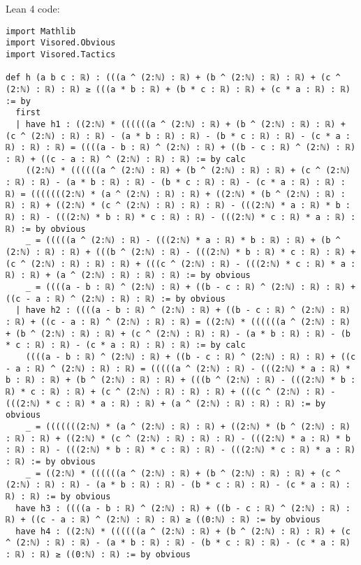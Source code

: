 \documentclass{article}
\begin{document}
Lean 4 code:
\begin{tcolorbox}[colback=white!10, width=\linewidth]
\begin{lstlisting}[language=Lean4]
import Mathlib
import Visored.Obvious
import Visored.Tactics

def h (a b c : ℝ) : (((a ^ (2:ℕ) : ℝ) + (b ^ (2:ℕ) : ℝ) : ℝ) + (c ^ (2:ℕ) : ℝ) : ℝ) ≥ (((a * b : ℝ) + (b * c : ℝ) : ℝ) + (c * a : ℝ) : ℝ) := by
  first
  | have h1 : ((2:ℕ) * ((((((a ^ (2:ℕ) : ℝ) + (b ^ (2:ℕ) : ℝ) : ℝ) + (c ^ (2:ℕ) : ℝ) : ℝ) - (a * b : ℝ) : ℝ) - (b * c : ℝ) : ℝ) - (c * a : ℝ) : ℝ) : ℝ) = ((((a - b : ℝ) ^ (2:ℕ) : ℝ) + ((b - c : ℝ) ^ (2:ℕ) : ℝ) : ℝ) + ((c - a : ℝ) ^ (2:ℕ) : ℝ) : ℝ) := by calc
    ((2:ℕ) * ((((((a ^ (2:ℕ) : ℝ) + (b ^ (2:ℕ) : ℝ) : ℝ) + (c ^ (2:ℕ) : ℝ) : ℝ) - (a * b : ℝ) : ℝ) - (b * c : ℝ) : ℝ) - (c * a : ℝ) : ℝ) : ℝ) = (((((((2:ℕ) * (a ^ (2:ℕ) : ℝ) : ℝ) + ((2:ℕ) * (b ^ (2:ℕ) : ℝ) : ℝ) : ℝ) + ((2:ℕ) * (c ^ (2:ℕ) : ℝ) : ℝ) : ℝ) - (((2:ℕ) * a : ℝ) * b : ℝ) : ℝ) - (((2:ℕ) * b : ℝ) * c : ℝ) : ℝ) - (((2:ℕ) * c : ℝ) * a : ℝ) : ℝ) := by obvious
    _ = (((((a ^ (2:ℕ) : ℝ) - (((2:ℕ) * a : ℝ) * b : ℝ) : ℝ) + (b ^ (2:ℕ) : ℝ) : ℝ) + (((b ^ (2:ℕ) : ℝ) - (((2:ℕ) * b : ℝ) * c : ℝ) : ℝ) + (c ^ (2:ℕ) : ℝ) : ℝ) : ℝ) + (((c ^ (2:ℕ) : ℝ) - (((2:ℕ) * c : ℝ) * a : ℝ) : ℝ) + (a ^ (2:ℕ) : ℝ) : ℝ) : ℝ) := by obvious
    _ = ((((a - b : ℝ) ^ (2:ℕ) : ℝ) + ((b - c : ℝ) ^ (2:ℕ) : ℝ) : ℝ) + ((c - a : ℝ) ^ (2:ℕ) : ℝ) : ℝ) := by obvious
  | have h2 : ((((a - b : ℝ) ^ (2:ℕ) : ℝ) + ((b - c : ℝ) ^ (2:ℕ) : ℝ) : ℝ) + ((c - a : ℝ) ^ (2:ℕ) : ℝ) : ℝ) = ((2:ℕ) * ((((((a ^ (2:ℕ) : ℝ) + (b ^ (2:ℕ) : ℝ) : ℝ) + (c ^ (2:ℕ) : ℝ) : ℝ) - (a * b : ℝ) : ℝ) - (b * c : ℝ) : ℝ) - (c * a : ℝ) : ℝ) : ℝ) := by calc
    ((((a - b : ℝ) ^ (2:ℕ) : ℝ) + ((b - c : ℝ) ^ (2:ℕ) : ℝ) : ℝ) + ((c - a : ℝ) ^ (2:ℕ) : ℝ) : ℝ) = (((((a ^ (2:ℕ) : ℝ) - (((2:ℕ) * a : ℝ) * b : ℝ) : ℝ) + (b ^ (2:ℕ) : ℝ) : ℝ) + (((b ^ (2:ℕ) : ℝ) - (((2:ℕ) * b : ℝ) * c : ℝ) : ℝ) + (c ^ (2:ℕ) : ℝ) : ℝ) : ℝ) + (((c ^ (2:ℕ) : ℝ) - (((2:ℕ) * c : ℝ) * a : ℝ) : ℝ) + (a ^ (2:ℕ) : ℝ) : ℝ) : ℝ) := by obvious
    _ = (((((((2:ℕ) * (a ^ (2:ℕ) : ℝ) : ℝ) + ((2:ℕ) * (b ^ (2:ℕ) : ℝ) : ℝ) : ℝ) + ((2:ℕ) * (c ^ (2:ℕ) : ℝ) : ℝ) : ℝ) - (((2:ℕ) * a : ℝ) * b : ℝ) : ℝ) - (((2:ℕ) * b : ℝ) * c : ℝ) : ℝ) - (((2:ℕ) * c : ℝ) * a : ℝ) : ℝ) := by obvious
    _ = ((2:ℕ) * ((((((a ^ (2:ℕ) : ℝ) + (b ^ (2:ℕ) : ℝ) : ℝ) + (c ^ (2:ℕ) : ℝ) : ℝ) - (a * b : ℝ) : ℝ) - (b * c : ℝ) : ℝ) - (c * a : ℝ) : ℝ) : ℝ) := by obvious
  have h3 : ((((a - b : ℝ) ^ (2:ℕ) : ℝ) + ((b - c : ℝ) ^ (2:ℕ) : ℝ) : ℝ) + ((c - a : ℝ) ^ (2:ℕ) : ℝ) : ℝ) ≥ ((0:ℕ) : ℝ) := by obvious
  have h4 : ((2:ℕ) * ((((((a ^ (2:ℕ) : ℝ) + (b ^ (2:ℕ) : ℝ) : ℝ) + (c ^ (2:ℕ) : ℝ) : ℝ) - (a * b : ℝ) : ℝ) - (b * c : ℝ) : ℝ) - (c * a : ℝ) : ℝ) : ℝ) ≥ ((0:ℕ) : ℝ) := by obvious

\end{lstlisting}
\end{tcolorbox}
\end{document}
